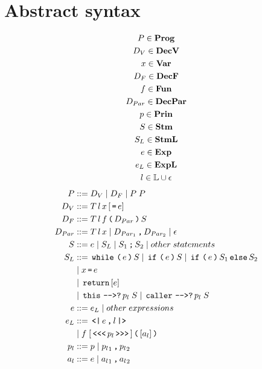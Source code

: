 \section{Abstract syntax}

\begin{gather*}
  P       \in \mathbf{Prog}\\
  D_V     \in \mathbf{DecV}\\
  x       \in \mathbf{Var}\\
  D_F     \in \mathbf{DecF} \\
  f       \in \mathbf{Fun}\\
  D_{Par} \in \mathbf{DecPar}\\
  p       \in \mathbf{Prin}\\
  S       \in \mathbf{Stm}\\
  S_L     \in \mathbf{StmL}\\
  e       \in \mathbf{Exp}\\
  e_L     \in \mathbf{ExpL}\\
  l       \in \mathbb{L} \cup \epsilon\\
\end{gather*}
\begin{align*}
  P         & ::= D_V \gp D_F \gp P \; P \\
  D_V       & ::= T \, l \, x \, [\tk = e] \\
  D_F       & ::= T \, l \, f \tk ( D_{Par} \tk ) S \\
  D_{Par}   & ::= T \, l \, x \gp D_{Par_1} \tk , D_{Par_2} \gp \epsilon \\
  S         & ::= e \gp S_L \gp S_1 \tk ; S_2 \gp other \; statements \\
  S_L       & ::= \tk{while} \tk ( e \tk ) S \gp \tk{if} \tk ( e \tk ) S \gp \tk{if} \tk ( e \tk ) S_1 \tk{else} S_2 \\
            & \gp x \tk = e \\
            & \gp \tk{return} [e] \\
            & \gp \tk{this} \tk{-{}->?} p_l \; S \gp \tk{caller} \tk{-{}->?} p_l \; S \\
  e         & ::= e_L \gp other \; expressions \\
  e_L       & ::= \tk{<|} e \tk , l \tk{|>} \\
            & \gp f \; [\tk{<{}<{}<} p_l \tk{>{}>{}>}] \tk ( [a_l] \tk ) \\
  p_l       & ::= p \gp {p_l}_1 \tk , {p_l}_2 \\
  a_l       & ::= e \gp {a_l}_1 \tk , {a_l}_2
\end{align*}
